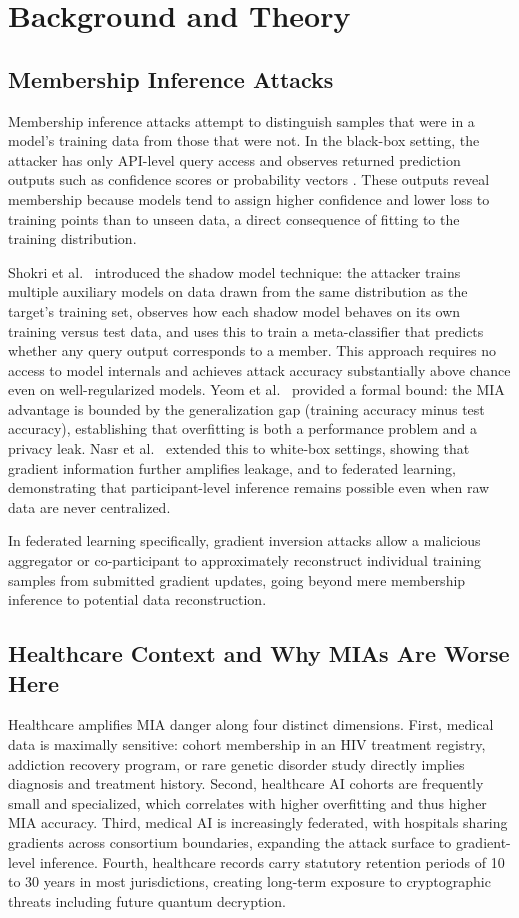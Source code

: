 \documentclass[conference]{IEEEtran}
\begin{document}
	\section{Background and Theory}

	\subsection{Membership Inference Attacks}
	Membership inference attacks attempt to distinguish samples that were in a model's training data from those that were not. In the black-box setting, the attacker has only API-level query access and observes returned prediction outputs such as confidence scores or probability vectors \cite{shokri2017,yeom2018}. These outputs reveal membership because models tend to assign higher confidence and lower loss to training points than to unseen data, a direct consequence of fitting to the training distribution.

	Shokri et al.\ \cite{shokri2017} introduced the shadow model technique: the attacker trains multiple auxiliary models on data drawn from the same distribution as the target's training set, observes how each shadow model behaves on its own training versus test data, and uses this to train a meta-classifier that predicts whether any query output corresponds to a member. This approach requires no access to model internals and achieves attack accuracy substantially above chance even on well-regularized models. Yeom et al.\ \cite{yeom2018} provided a formal bound: the MIA advantage is bounded by the generalization gap (training accuracy minus test accuracy), establishing that overfitting is both a performance problem and a privacy leak. Nasr et al.\ \cite{nasr2019} extended this to white-box settings, showing that gradient information further amplifies leakage, and to federated learning, demonstrating that participant-level inference remains possible even when raw data are never centralized.

	In federated learning specifically, gradient inversion attacks allow a malicious aggregator or co-participant to approximately reconstruct individual training samples from submitted gradient updates, going beyond mere membership inference to potential data reconstruction.

	\subsection{Healthcare Context and Why MIAs Are Worse Here}
	Healthcare amplifies MIA danger along four distinct dimensions. First, medical data is maximally sensitive: cohort membership in an HIV treatment registry, addiction recovery program, or rare genetic disorder study directly implies diagnosis and treatment history. Second, healthcare AI cohorts are frequently small and specialized, which correlates with higher overfitting and thus higher MIA accuracy. Third, medical AI is increasingly federated, with hospitals sharing gradients across consortium boundaries, expanding the attack surface to gradient-level inference. Fourth, healthcare records carry statutory retention periods of 10 to 30 years in most jurisdictions, creating long-term exposure to cryptographic threats including future quantum decryption.
\end{document}

